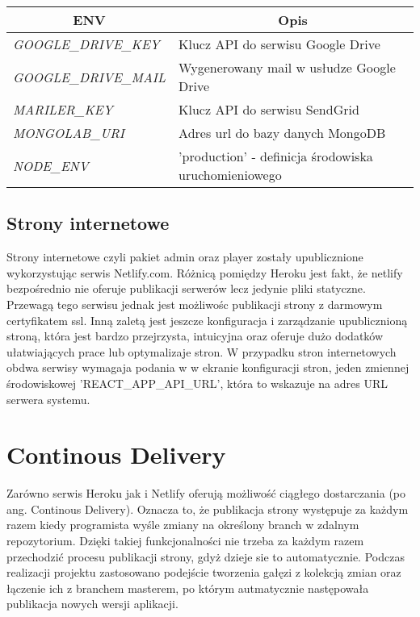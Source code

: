 \begin{table}[h!]
\centering
\begin{tabular}{|l|l|}
\hline
\multicolumn{1}{|c|}{\textbf{ENV}} & \multicolumn{1}{c|}{\textbf{Opis}} \\ \hline
\textit{GOOGLE\_DRIVE\_KEY} & Klucz API do serwisu Google Drive \\ \hline
\textit{GOOGLE\_DRIVE\_MAIL} & Wygenerowany mail w usłudze Google Drive \\ \hline
\textit{MARILER\_KEY} & Klucz API do serwisu SendGrid \\ \hline
\textit{MONGOLAB\_URI} & Adres url do bazy danych MongoDB \\ \hline
\textit{NODE\_ENV} & 'production' - definicja środowiska uruchomieniowego \\ \hline
\end{tabular}
\end{table}

\subsection{Strony internetowe}
Strony internetowe czyli pakiet admin oraz player zostały upublicznione wykorzystując serwis Netlify.com. Różnicą pomiędzy Heroku jest fakt, że netlify bezpośrednio nie oferuje publikacji serwerów lecz jedynie pliki statyczne. Przewagą tego serwisu jednak jest możliwośc publikacji strony z darmowym certyfikatem ssl. Inną zaletą jest jeszcze konfiguracja i zarządzanie upublicznioną stroną, która jest bardzo przejrzysta, intuicyjna oraz oferuje dużo dodatków ułatwiających prace lub optymalizaje stron. W przypadku stron internetowych obdwa serwisy wymagaja podania w w ekranie konfiguracji stron, jeden zmiennej środowiskowej 'REACT\_APP\_API\_URL', która to wskazuje na adres URL serwera systemu.


\section{Continous Delivery}
Zarówno serwis Heroku jak i Netlify oferują możliwość ciągłego dostarczania (po ang. Continous Delivery). Oznacza to, że publikacja strony występuje za każdym razem kiedy programista wyśle zmiany na określony branch w zdalnym repozytorium. Dzięki takiej funkcjonalności nie trzeba za każdym razem przechodzić procesu publikacji strony, gdyż dzieje sie to automatycznie. Podczas realizacji projektu zastosowano podejście tworzenia gałęzi z kolekcją zmian oraz łączenie ich z branchem masterem, po którym autmatycznie następowała publikacja nowych wersji aplikacji.